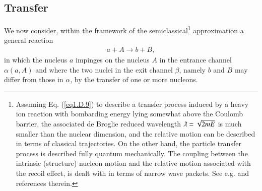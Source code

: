 \begin{subappendices}
\subsection{Transfer}\label{S2B2}
We now consider, within the framework of the semiclassical\footnote{Assuming Eq. (\ref{eq1.D.9}) to describe a transfer process induced by a heavy ion reaction with bombarding energy lying somewhat above the Coulomb barrier, the associated de Broglie reduced wavelength $\lambdabar=\sqrt{2mE}$ is much smaller than the nuclear dimension, and the relative motion can be described in terms of classical trajectories. On the other hand, the particle transfer process is described fully quantum mechanically. The coupling between the intrinsic (structure) nucleon motion and the relative motion associated with the recoil effect, is dealt with in terms of narrow wave packets. See e.g. \cite{Broglia:04a} and references therein.} approximation a general reaction
\begin{align}\label{eq1.D.9}
a+A\rightarrow b+B,
\end{align}
in which the nucleus $a$ impinges on the nucleus $A$ in the entrance channel $\alpha(a,A)$ and where the two nuclei in the exit channel $\beta$, namely $b$ and $B$ may differ from those in $\alpha$, by the transfer of one or more nucleons.





\end{subappendices}
